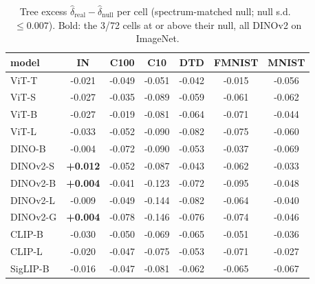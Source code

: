 \begin{table}[H]
\centering
\small
\begin{tabular}{lcccccc}
\toprule
model & IN & C100 & C10 & DTD & FMNIST & MNIST \\
\midrule
ViT-T & -0.021 & -0.049 & -0.051 & -0.042 & -0.015 & -0.056 \\
ViT-S & -0.027 & -0.035 & -0.089 & -0.059 & -0.061 & -0.062 \\
ViT-B & -0.027 & -0.019 & -0.081 & -0.064 & -0.071 & -0.044 \\
ViT-L & -0.033 & -0.052 & -0.090 & -0.082 & -0.075 & -0.060 \\
DINO-B & -0.004 & -0.072 & -0.090 & -0.053 & -0.037 & -0.069 \\
DINOv2-S & \textbf{+0.012} & -0.052 & -0.087 & -0.043 & -0.062 & -0.033 \\
DINOv2-B & \textbf{+0.004} & -0.041 & -0.123 & -0.072 & -0.095 & -0.048 \\
DINOv2-L & -0.009 & -0.049 & -0.144 & -0.082 & -0.064 & -0.040 \\
DINOv2-G & \textbf{+0.004} & -0.078 & -0.146 & -0.076 & -0.074 & -0.046 \\
CLIP-B & -0.030 & -0.050 & -0.069 & -0.065 & -0.051 & -0.036 \\
CLIP-L & -0.020 & -0.047 & -0.075 & -0.053 & -0.071 & -0.027 \\
SigLIP-B & -0.016 & -0.047 & -0.081 & -0.062 & -0.065 & -0.067 \\
\bottomrule
\end{tabular}
\caption{Tree excess $\hat\delta_{\mathrm{real}}-\hat\delta_{\mathrm{null}}$ per cell (spectrum-matched null; null s.d.\ $\le 0.007$). Bold: the 3/72 cells at or above their null, all DINOv2 on ImageNet.}
\label{tab:a1}
\end{table}

